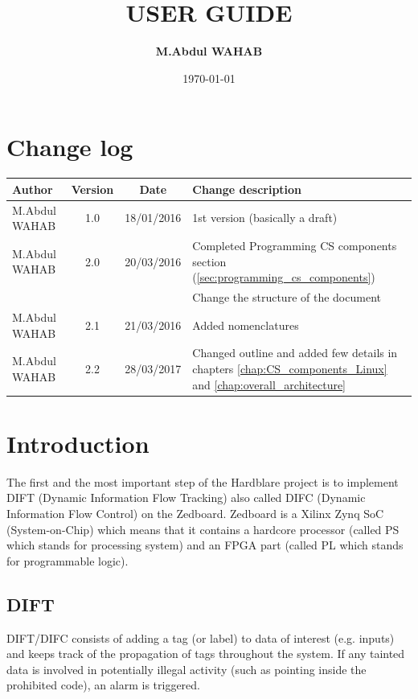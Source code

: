 \documentclass[10pt,a4paper, oneside]{memoir}
\title{\Huge\textbf{USER GUIDE}}
\author{\Large\textbf{M.Abdul WAHAB}}
\date{\Large{\today}}
\begin{document}



\maketitle
\pagebreak
\tableofcontents
\newpage
\listoffigures
\newpage
\listoftables
\newpage
\printnomenclature
\newpage
{}



\chapter*{Change log}
\begin{table}[]
\centering
\begin{tabular}{lccl}
\toprule
\textbf{Author} & \textbf{Version} & \textbf{Date} & \textbf{Change description}\\
\midrule
M.Abdul WAHAB & 1.0 & 18/01/2016 & 1st version (basically a draft)\\
M.Abdul WAHAB & 2.0 & 20/03/2016 & Completed Programming CS components section (\ref{sec:programming_cs_components})  \\
 & & & Change the structure of the document \\
M.Abdul WAHAB & 2.1 & 21/03/2016 & Added nomenclatures \\
M.Abdul WAHAB & 2.2 & 28/03/2017 & Changed outline and added few details in chapters \ref{chap:CS_components_Linux} and \ref{chap:overall_architecture}\\
\bottomrule
\end{tabular}
\end{table}
\pagebreak


\chapter{Introduction}
The first and the most important step of the Hardblare project is to implement DIFT (Dynamic Information Flow Tracking) also called DIFC (Dynamic Information Flow Control) on the Zedboard. Zedboard is a Xilinx Zynq SoC (System-on-Chip) which means that it contains a hardcore processor (called PS which stands for processing system) and an FPGA part (called PL which stands for programmable logic). 

\section{DIFT}
DIFT/DIFC consists of adding a tag (or label) to data of interest (e.g. inputs) and keeps track of the propagation of tags throughout the system. If any tainted data is involved in potentially illegal activity (such as pointing inside the prohibited code), an alarm is triggered. 
\end{document}
